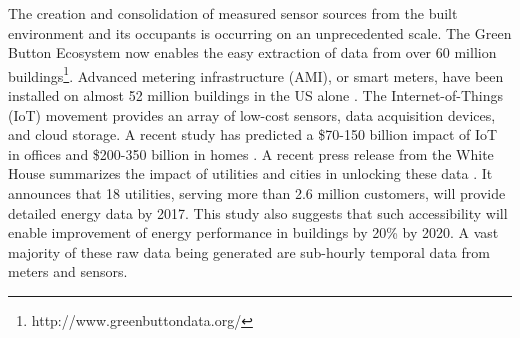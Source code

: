 The creation and consolidation of measured sensor sources from the built environment and its occupants is occurring on an unprecedented scale. The Green Button Ecosystem now enables the easy extraction of data from over 60 million buildings\footnote{http://www.greenbuttondata.org/}. Advanced metering infrastructure (AMI), or smart meters, have been installed on almost 52 million buildings in the US alone \cite{energy_information_administration_how_2015}. The Internet-of-Things (IoT) movement provides an array of low-cost sensors, data acquisition devices, and cloud storage. A recent study has predicted a \$70-150 billion impact of IoT in offices and \$200-350 billion in homes \cite{james_manyika_unlocking_2015}. A recent press release from the White House summarizes the impact of utilities and cities in unlocking these data \cite{_fact_2016}. It announces that 18 utilities, serving more than 2.6 million customers, will provide detailed energy data by 2017. This study also suggests that such accessibility will enable improvement of energy performance in buildings by 20\% by 2020. A vast majority of these raw data being generated are sub-hourly temporal data from meters and sensors.
